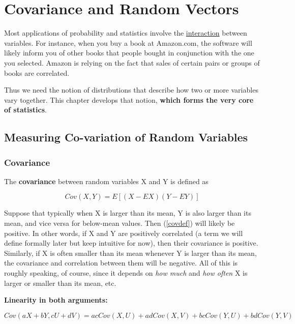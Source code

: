 \chapter{Covariance and Random Vectors} 
\label{randvec}

Most applications of probability and statistics involve the
\underline{interaction} between variables.  For instance, when you buy a
book at Amazon.com, the software will likely inform you of other books
that people bought in conjunction with the one you selected.  Amazon is
relying on the fact that sales of certain pairs or groups of books are
correlated.

Thus we need the notion of distributions that describe how two or more
variables vary together.  This chapter develops that notion, {\bf which
forms the very core of statistics}.

\section{Measuring Co-variation of Random Variables}

\subsection{Covariance}
\label{covar}

\begin{definition}
The {\bf covariance} between random variables X and Y is defined as

\begin{equation}
\label{covdef}
Cov(X,Y) = E[(X-EX) (Y-EY)]
\end{equation}
\end{definition}

Suppose that typically when X is larger than its mean, Y is also larger
than its mean, and vice versa for below-mean values.  Then (\ref{covdef})
will likely be positive.  In other words, if X and Y are positively
correlated (a term we will define formally later but keep intuitive for
now), then their covariance is positive.  Similarly, if X is often smaller
than its mean whenever Y is larger than its mean, the covariance and
correlation between them will be negative.  All of this is roughly
speaking, of course, since it depends on {\it how much} and {\it how
often} X is larger or
smaller than its mean, etc.

{\bf Linearity in both arguments:}

\begin{equation}
\label{covlin}
Cov(aX+bY,cU+dV) = ac Cov(X,U) + ad Cov(X,V) + bc Cov(Y,U) + bd Cov(Y,V) 
\end{equation}

